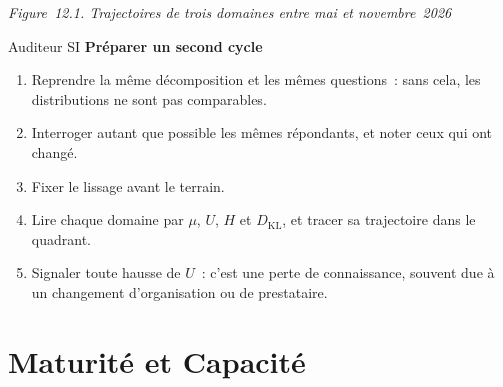 \noindent\begin{minipage}{\linewidth}
\begin{center}
\end{center}
\vspace{-0.4em}
\begin{center}{\small\itshape Figure~12.1. Trajectoires de trois domaines
entre mai et novembre~2026}\end{center}
\end{minipage}

\begin{boxmetier}{Auditeur SI}
\textbf{Préparer un second cycle}
\begin{enumerate}
    \item Reprendre la même décomposition et les mêmes questions~: sans
          cela, les distributions ne sont pas comparables.
    \item Interroger autant que possible les mêmes répondants, et noter
          ceux qui ont changé.
    \item Fixer le lissage avant le terrain.
    \item Lire chaque domaine par $\mu$, $U$, $H$ et $D_{\mathrm{KL}}$, et
          tracer sa trajectoire dans le quadrant.
    \item Signaler toute hausse de $U$~: c'est une perte de connaissance,
          souvent due à un changement d'organisation ou de prestataire.
\end{enumerate}
\end{boxmetier}

\section{Maturité et Capacité}
\label{sec:c12-maturite}

